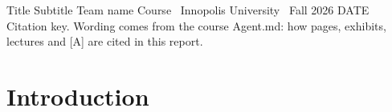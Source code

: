 \documentclass[oneside,final,12pt,a4paper]{article}
\begin{document}
\begin{coursereporttitle}
  {Title}
  {Subtitle}
  {Team name}
  {%
  }
  {Course \textperiodcentered\ Innopolis University \textperiodcentered\ Fall 2026}
  {DATE}
Citation key. Wording comes from the course Agent.md: how pages, exhibits, lectures and [A] are cited in this report.
\end{coursereporttitle}

\section{Introduction}

\printbibliography
\end{document}

